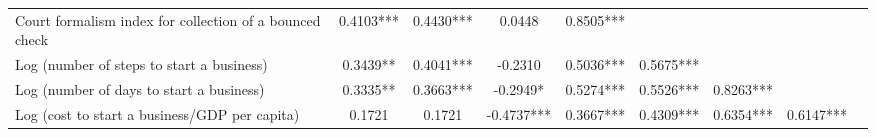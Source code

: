 \documentclass{article}
\begin{document}
\begin{landscape}
\begin{table}[ht]
\begin{tabular}{@{}l*{8}{S[table-format=1.4]}@{}}
        Court formalism index for collection of a bounced check & 0.4103*** & 0.4430*** & 0.0448 & 0.8505*** & & & & \\
        Log (number of steps to start a business) & 0.3439** & 0.4041*** & -0.2310 & 0.5036*** & 0.5675*** & & & \\
        Log (number of days to start a business) & 0.3335** & 0.3663*** & -0.2949* & 0.5274*** & 0.5526*** & 0.8263*** & & \\
        Log (cost to start a business/GDP per capita) & 0.1721 & 0.1721 & -0.4737*** & 0.3667*** & 0.4309*** & 0.6354*** & 0.6147*** & \\
        \bottomrule
    \end{tabular}
    \label{tab:correlation_matrix}
\end{table}
\end{landscape}
\end{document}
